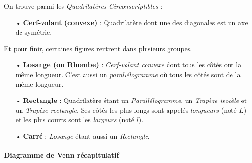 \documentclass[a4paper, twoside]{article}
\begin{document}
\bigbreak

On trouve parmi les \emph{Quadrilatères Circonscriptibles} :

\begin{itemize}
	\item[•] \textbf{Cerf-volant (convexe)} : Quadrilatère dont une des diagonales est un axe de symétrie.
\end{itemize}

\bigbreak

Et pour finir, certaines figures rentrent dans plusieurs groupes.

\begin{itemize}
	\item[•] \textbf{Losange (ou Rhombe)} : \textit{Cerf-volant convexe} dont tous les côtés ont la même longueur. C'est aussi un \textit{parallélogramme} où tous les côtés sont de la même longueur.
	\item[•] \textbf{Rectangle} : Quadrilatère étant un \textit{Parallélogramme}, un \textit{Trapèze isocèle} et un \textit{Trapèze rectangle}.
	      Ses côtés les plus longs sont appelés \emph{longueurs} (noté $L$) et les plus courts sont les \emph{largeurs} (noté $l$).
	\item[•] \textbf{Carré} : \textit{Losange} étant aussi un \textit{Rectangle}.
\end{itemize}

\newpage
\paragraph*{Diagramme de Venn récapitulatif}

\begin{center}
\end{center}
\end{document}
